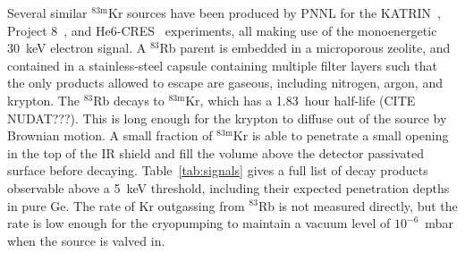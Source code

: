 \documentclass[nofootinbib,superscriptaddress, aps, prc, 
10pt, amsmath, amssymb, bibnotes,
altaffilletter, twocolumn, floatfix]{revtex4-2}
\def\kr83{{${}^{83\mathrm{m}}$Kr}}
\begin{document}
    Several similar \kr83 sources have been produced by PNNL for the KATRIN~\cite{venos2018properties}, Project 8~\cite{project8cres2015}, and He6-CRES~\cite{he6cres2022} experiments, all making use of the monoenergetic 30~keV electron signal.
    A $^{83}$Rb parent is embedded in a microporous zeolite, and contained in a stainless-steel capsule containing multiple filter layers such that the only products allowed to escape are gaseous, including nitrogen, argon, and krypton.
    The $^{83}$Rb decays to \kr83, which has a 1.83~hour half-life (CITE NUDAT???).
    This is long enough for the krypton to diffuse out of the source by Brownian motion.  
    A small fraction of \kr83 is able to penetrate a small opening in the top of the IR shield and fill the volume above the detector passivated surface before decaying.
    Table~\ref{tab:signals} gives a full list of decay products observable above a 5~keV threshold, including their expected penetration depths in pure Ge.
    The rate of Kr outgassing from $^{83}$Rb is not measured directly, but the rate is low enough for the cryopumping to maintain a vacuum level of $10^{-6}$~mbar when the source is valved in.
\end{document}
